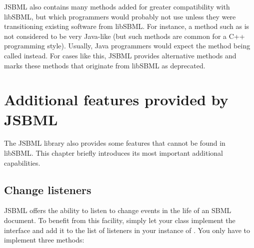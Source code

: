 JSBML also contains many methods added for greater compatibility with
libSBML, but which programmers would probably not use unless they were
transitioning existing software from libSBML.  For instance, a method such
as  is not considered to be very Java-like (but such
methods are common for a C++ programming style). Usually, Java
programmers would expect the method being called 
instead. For cases like this, JSBML provides alternative methods and marks
these methods that originate from libSBML as deprecated.


\chapter{Additional features provided by JSBML}
\label{chp:additional-jsbml-features}


The JSBML library also provides some features that cannot be found in libSBML.
This chapter briefly introduces its most important additional capabilities.

\section{Change listeners}

JSBML offers the ability to listen to change events in the life of an SBML
document. To benefit from this facility, simply let your class implement
the interface \TreeNodeChangeListener and add it to the list of listeners
in your instance of \SBMLDocument. You only have to implement three
methods:

